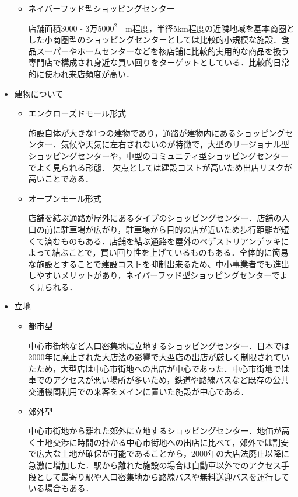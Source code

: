 \begin{itemize}
\begin{itemize}
 \item	ネイバーフッド型ショッピングセンター

店舗面積3000 - $3万5000^{2}$　m程度，半径5km程度の近隣地域を基本商圏とした小商圏型のショッピングセンターとしては比較的小規模な施設．食品スーパーやホームセンターなどを核店舗に比較的実用的な商品を扱う専門店で構成され身近な買い回りをターゲットとしている．比較的日常的に使われ来店頻度が高い．

\end{itemize}

 \item	建物について

\begin{itemize}
\setlength{\parskip}{3mm}

 \item	エンクローズドモール形式

施設自体が大きな1つの建物であり，通路が建物内にあるショッピングセンター．気候や天気に左右されないのが特徴で，大型のリージョナル型ショッピングセンターや，中型のコミュニティ型ショッピングセンターでよく見られる形態．
欠点としては建設コストが高いため出店リスクが高いことである．

 \item	オープンモール形式

店舗を結ぶ通路が屋外にあるタイプのショッピングセンター．店舗の入口の前に駐車場が広がり，駐車場から目的の店が近いため歩行距離が短くて済むものもある．店舗を結ぶ通路を屋外のペデストリアンデッキによって結ぶことで，買い回り性を上げているものもある．全体的に簡易な施設とすることで建設コストを抑制出来るため、中小事業者でも進出しやすいメリットがあり，ネイバーフッド型ショッピングセンターでよく見られる．

\end{itemize}

 \item	立地

\begin{itemize}
\setlength{\parskip}{3mm}

 \item	都市型

中心市街地など人口密集地に立地するショッピングセンター．日本では2000年に廃止された大店法の影響で大型店の出店が厳しく制限されていたため，大型店は中心市街地への出店が中心であった．中心市街地では車でのアクセスが悪い場所が多いため，鉄道や路線バスなど既存の公共交通機関利用での来客をメインに置いた施設が中心である．

 \item	郊外型

中心市街地から離れた郊外に立地するショッピングセンター．地価が高く土地交渉に時間の掛かる中心市街地への出店に比べて，郊外では割安で広大な土地が確保が可能であることから，2000年の大店法廃止以降に急激に増加した．駅から離れた施設の場合は自動車以外でのアクセス手段として最寄り駅や人口密集地から路線バスや無料送迎バスを運行している場合もある．

\end{itemize}

\end{itemize}

